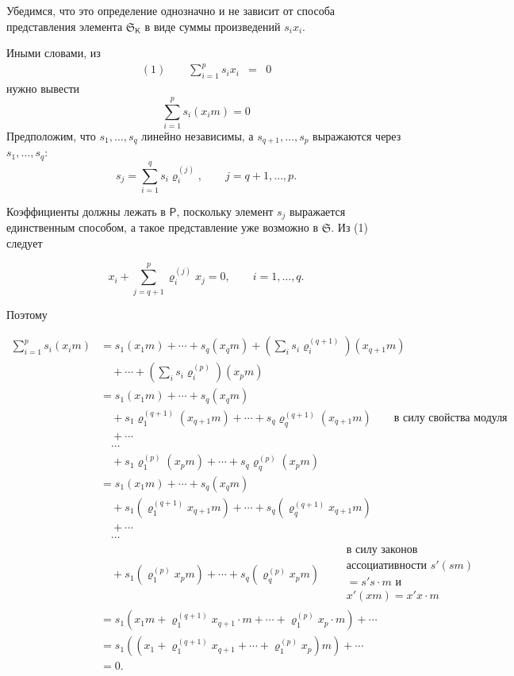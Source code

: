 \documentclass[11pt]{article}
\begin{document}
Убедимся, что это определение однозначно и не зависит от способа представления элемента \(\mathfrak S_{\mathsf K}\) в виде суммы произведений \(s_ix_i\).

Иными словами, из
\[
\begin{array}{rcl}
(1)\qquad \displaystyle\sum_{i=1}^{p}s_ix_i&=&0
\end{array}
\]
нужно вывести
\[
\sum_{i=1}^{p}s_i(x_i m)=0
\]
Предположим, что \(s_1,\ldots,s_q\) линейно независимы, а \(s_{q+1},\ldots,s_p\) выражаются через \(s_1,\ldots,s_q\):
\[
s_j=\sum_{i=1}^{q}s_i\varrho_i^{(j)},\qquad j=q+1,\ldots,p.
\]

Коэффициенты должны лежать в \(\mathsf P\), поскольку элемент \(s_j\) выражается единственным способом, а такое представление уже возможно в \(\mathfrak S\). Из (1) следует

\[
x_i+\sum_{j=q+1}^{p}\varrho_i^{(j)}x_j=0,\qquad i=1,\ldots,q.
\]

Поэтому

\[
\begin{aligned}
\sum_{i=1}^{p}s_i(x_i m)
&=s_1(x_1m)+\cdots+s_q(x_qm)
  +\left(\sum_i s_i\varrho_i^{(q+1)}\right)(x_{q+1}m)\\
&\quad+\cdots+\left(\sum_i s_i\varrho_i^{(p)}\right)(x_pm)\\
&=s_1(x_1m)+\cdots+s_q(x_qm)\\
&\quad+s_1\varrho_1^{(q+1)}(x_{q+1}m)+\cdots+s_q\varrho_q^{(q+1)}(x_{q+1}m)
  \qquad\text{в силу свойства модуля}\\
&\quad+\cdots\\
&\quad\cdots\\
&\quad+s_1\varrho_1^{(p)}(x_pm)+\cdots+s_q\varrho_q^{(p)}(x_pm)\\
&=s_1(x_1m)+\cdots+s_q(x_qm)\\
&\quad+s_1(\varrho_1^{(q+1)}x_{q+1}m)+\cdots+s_q(\varrho_q^{(q+1)}x_{q+1}m)\\
&\quad+\cdots\\
&\quad\cdots\\
&\quad+s_1(\varrho_1^{(p)}x_pm)+\cdots+s_q(\varrho_q^{(p)}x_pm)
  \qquad\begin{gathered}\text{в силу законов}\\ \text{ассоциативности }s'(sm)\\ =s's\cdot m\text{ и}\\ x'(xm)=x'x\cdot m\end{gathered}\\
&=s_1\left(x_1m+\varrho_1^{(q+1)}x_{q+1}\cdot m+\cdots+\varrho_1^{(p)}x_p\cdot m\right)+\cdots\\
&=s_1\left(\left(x_1+\varrho_1^{(q+1)}x_{q+1}+\cdots+\varrho_1^{(p)}x_p\right)m\right)+\cdots\\
&=0.
\end{aligned}
\]
\end{document}

